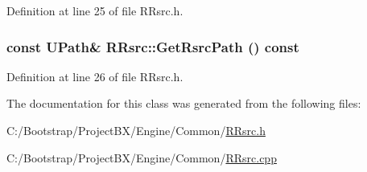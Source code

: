 Definition at line 25 of file RRsrc.h.\hypertarget{class_r_rsrc_f32b294a2318f9011ef946dd9142c52f}{
\subsubsection[{GetRsrcPath}]{\setlength{\rightskip}{0pt plus 5cm}const {\bf UPath}\& RRsrc::GetRsrcPath () const}}
\label{class_r_rsrc_f32b294a2318f9011ef946dd9142c52f}




Definition at line 26 of file RRsrc.h.

The documentation for this class was generated from the following files:\begin{CompactItemize}
\item 
C:/Bootstrap/ProjectBX/Engine/Common/\hyperlink{_r_rsrc_8h}{RRsrc.h}\item 
C:/Bootstrap/ProjectBX/Engine/Common/\hyperlink{_r_rsrc_8cpp}{RRsrc.cpp}\end{CompactItemize}
